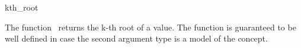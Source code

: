 \begin{ccRefFunction}{kth_root}

\ccDefinition

The function \ccRefName\ returns the k-th root of a value.
The function is guaranteed to be well defined in case the second argument type 
is a model of the  concept. 


{}


\ccSeeAlso

\\
\\


\end{ccRefFunction}
